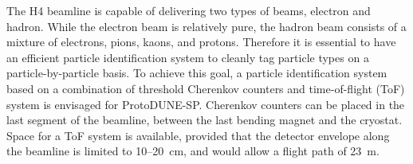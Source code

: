 The H4 beamline is capable of delivering two types of beams, electron and hadron. %
While the electron beam is relatively pure, the hadron beam consists of a mixture of electrons, pions, kaons, and protons. Therefore it is essential to have an efficient particle identification system to cleanly tag particle types on a particle-by-particle basis. To achieve this goal, a particle identification system based on a combination of threshold Cherenkov counters and time-of-flight (ToF) system is envisaged for ProtoDUNE-SP. 
Cherenkov counters can be placed in the last segment of the beamline, between the last bending magnet and the cryostat. Space for a ToF system is available, provided that the detector envelope along the beamline is limited to 10--20~cm,
and would allow a flight path of 23~m.

